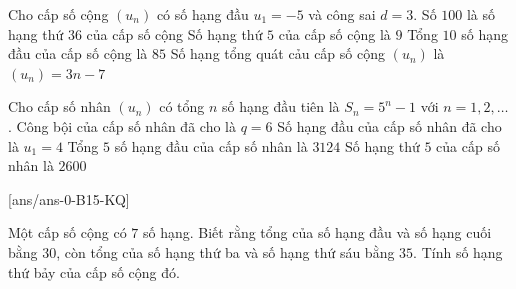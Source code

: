 \begin{ex}%
Cho cấp số cộng $\left(u_n\right)$ có số hạng đầu $u_1=-5$ và công sai $ d=3$.
\choiceTF
{\True Số $100$ là số hạng thứ $36$ của cấp số cộng}
{ Số hạng thứ $5$ của cấp số cộng là $ 9$}
{\True Tổng $10$ số hạng đầu của cấp số cộng là $85$}
{Số hạng tổng quát cảu cấp số cộng $\left(u_n\right)$ là $\left(u_n\right)=3n-7$}
\end{ex}

\begin{ex}%
Cho cấp số nhân $\left(u_n\right)$ có tổng $n$ số hạng đầu tiên là $S_n=5^n-1$ với $n=1,2,\ldots$.
\choiceTF
{Công bội của cấp số nhân đã cho là $q=6$ }
{ \True Số hạng đầu của cấp số nhân đã cho là $u_1=4$}
{\True Tổng $5$ số hạng đầu của cấp số nhân là $ 3124$}
{Số hạng thứ $5$ của cấp số nhân là $ 2600$}
\end{ex}


[ans/ans-0-B15-KQ]
\caukq
 \begin{ex}%
 Một cấp số cộng có $7$ số hạng. Biết rằng tổng của số hạng đầu và số hạng cuối bằng $30$, còn tổng của số hạng thứ ba và số hạng thứ sáu bằng $35$. Tính số hạng thứ bảy của cấp số cộng đó.
\end{ex}

